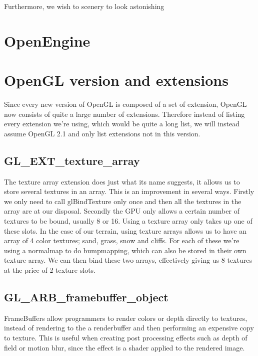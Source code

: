 Furthermore, we wish to scenery to look astonishing



\section{OpenEngine}



\section{OpenGL version and extensions}

Since every new version of OpenGL is composed of a set of extension,
OpenGL now consists of quite a large number of extensions. Therefore
instead of listing every extension we're using, which would be quite a
long list, we will instead assume OpenGL 2.1 and only list extensions
not in this version.

\subsection{GL\_EXT\_texture\_array}

The texture array extension does just what its name suggests, it
allows us to store several textures in an array. This is an
improvement in several ways. Firstly we only need to call
glBindTexture only once and then all the textures in the array are at
our disposal. Secondly the GPU only allows a certain number of
textures to be bound, usually 8 or 16. Using a texture array only
takes up one of these slots. In the case of our terrain, using texture
arrays allows us to have an array of 4 color textures; sand, grass,
snow and cliffs. For each of these we're using a normalmap to do
bumpmapping, which can also be stored in their own texture array. We
can then bind these two arrays, effectively giving us 8 textures at
the price of 2 texture slots.

\subsection{GL\_ARB\_framebuffer\_object}

FrameBuffers allow programmers to render colors or depth directly to
textures, instead of rendering to the a renderbuffer and then performing
an expensive copy to texture. This is useful when creating post
processing effects such as depth of field or motion blur, since the
effect is a shader applied to the rendered image.

